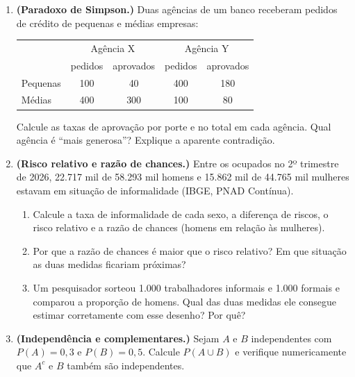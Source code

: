 \documentclass[11pt]{article}
\begin{document}
\begin{enumerate}[label=\textbf{A\arabic*.}, leftmargin=*]
\item \textbf{(Paradoxo de Simpson.)} Duas agências de um banco receberam pedidos de crédito de pequenas e médias empresas:
\begin{center}
\begin{tabular}{l|cc|cc}
\toprule
 & \multicolumn{2}{c|}{Agência X} & \multicolumn{2}{c}{Agência Y} \\
 & pedidos & aprovados & pedidos & aprovados \\
\midrule
Pequenas & 100 & 40 & 400 & 180 \\
Médias & 400 & 300 & 100 & 80 \\
\bottomrule
\end{tabular}
\end{center}
Calcule as taxas de aprovação por porte e no total em cada agência. Qual agência é ``mais generosa''? Explique a aparente contradição.

\item \textbf{(Risco relativo e razão de chances.)} Entre os ocupados no 2º trimestre de 2026, 22.717 mil de 58.293 mil homens e
15.862 mil de 44.765 mil mulheres estavam em situação de informalidade (IBGE, PNAD Contínua).
\begin{enumerate}[label=(\alph*)]
  \item Calcule a taxa de informalidade de cada sexo, a diferença de riscos, o risco relativo e a razão de chances (homens em relação às mulheres).
  \item Por que a razão de chances é maior que o risco relativo? Em que situação as duas medidas ficariam próximas?
  \item Um pesquisador sorteou 1.000 trabalhadores informais e 1.000 formais e comparou a proporção de homens. Qual das duas medidas
    ele consegue estimar corretamente com esse desenho? Por quê?
\end{enumerate}

\item \textbf{(Independência e complementares.)} Sejam $A$ e $B$ independentes com $P(A) = 0{,}3$ e $P(B) = 0{,}5$. Calcule $P(A \cup B)$ e
verifique numericamente que $A^c$ e $B$ também são independentes.

\end{enumerate}
\end{document}
